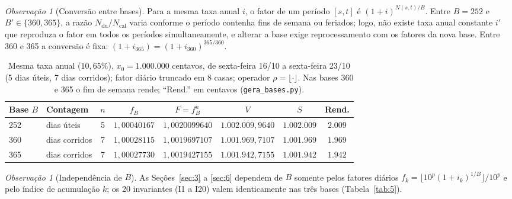 \documentclass[11pt, a4paper]{article}
\theoremstyle{definition}
\theoremstyle{plain}
\theoremstyle{remark}
\newtheorem{observacao}[definicao]{Observação}
\begin{document}
\begin{observacao}[Conversão entre bases]\label{obs:2.6}
Para a mesma taxa anual $i$, o fator de um período $[s,t]$ é $(1 + i)^{N(s,t)/B}$. Entre $B = 252$ e $B' \in \{360, 365\}$, a razão $N_{\text{du}}/N_{\text{cal}}$ varia conforme o período contenha fins de semana ou feriados; logo, não existe taxa anual constante $i'$ que reproduza o fator em todos os períodos simultaneamente, e alterar a base exige reprocessamento com os fatores da nova base. Entre 360 e 365 a conversão é fixa: $(1 + i_{365}) = (1 + i_{360})^{365/360}$.
\end{observacao}

\begin{table}[htbp]
\centering
\small
\begin{tabular}{@{}llcccccc@{}}
\toprule
\textbf{Base $B$} & \textbf{Contagem} & $n$ & $f_B$ & $F = f_B^n$ & $V$ & $S$ & \textbf{Rend.} \\
\midrule
252 & dias úteis    & 5 & $1{,}00040167$ & $1{,}0020099640$ & $1.002.009{,}9640$ & $1.002.009$ & $2.009$ \\
360 & dias corridos & 7 & $1{,}00028115$ & $1{,}0019697107$ & $1.001.969{,}7107$ & $1.001.969$ & $1.969$ \\
365 & dias corridos & 7 & $1{,}00027730$ & $1{,}0019427155$ & $1.001.942{,}7155$ & $1.001.942$ & $1.942$ \\
\bottomrule
\end{tabular}
\caption{Mesma taxa anual ($10{,}65\%$), $x_0 = 1.000.000$ centavos, de sexta-feira 16/10 a sexta-feira 23/10 (5 dias úteis, 7 dias corridos); fator diário truncado em 8 casas; operador $\rho = \lfloor \cdot \rfloor$. Nas bases 360 e 365 o fim de semana rende; ``Rend.'' em centavos (\texttt{gera\_bases.py}).}
\label{tab:1}
\end{table}

\begin{observacao}[Independência de $B$]\label{obs:2.7}
As Seções~\ref{sec:3} a \ref{sec:6} dependem de $B$ somente pelos fatores diários $f_k = \lfloor 10^p(1 + i_k)^{1/B}\rfloor / 10^p$ e pelo índice de acumulação $k$; os 20 invariantes (I1 a I20) valem identicamente nas três bases (Tabela~\ref{tab:5}).
\end{observacao}
\end{document}
